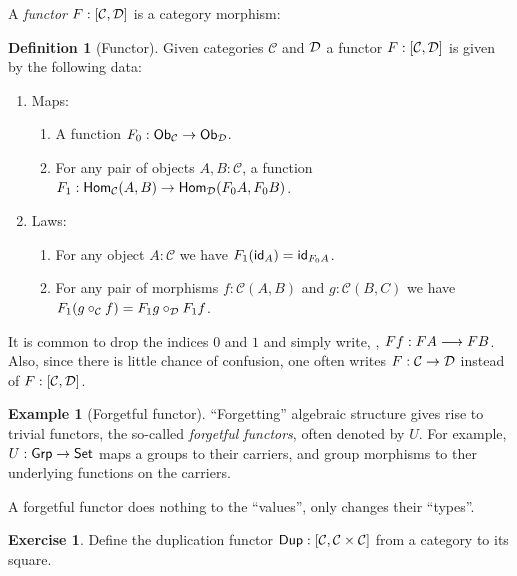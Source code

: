 \documentclass[a4paper,fleqn]{scrartcl}
\theoremstyle{definition}
\newtheorem{definition}{Definition}
\newtheorem{example}{Example}
\newtheorem{exercise}{Exercise}
\newcommand{\C}{\mathcal{C}}
\begin{document}
A \emph{functor} $F : [\C,\D]$ is a category morphism:
\begin{definition}[Functor]
  \label{def:functor}
  Given categories $\C$ and $\D$ a functor $F : [\C,\D]$
  is given by the following data:
  \begin{enumerate}
  \item Maps:
    \begin{enumerate}
    \item A function $F_0 : \Ob[\C] \to \Ob[\D]$.
    \item For any pair of objects $A,B : \C$, a function $F_1 :
      \Hom[\C](A,B) \to \Hom[\D](F_0A,F_0B)$.
    \end{enumerate}
  \item Laws:
    \begin{enumerate}
    \item For any object $A : \C$ we have $F_1(\id[A]) = \id[F_0A]$.
    \item For any pair of morphisms $f : \C(A,B)$ and $g : \C(B,C)$ we
      have $F_1(g \comp_\C f) = F_1g \comp_\D F_1f$.
    \end{enumerate}
  \end{enumerate}
\end{definition}
It is common to drop the indices $0$ and $1$ and simply write, \eg,
$Ff : FA \too FB$.
Also, since there is little chance of confusion, one often writes $F :
\C \to \D$ instead of $F : [\C,\D]$.
\begin{example}[Forgetful functor]
  ``Forgetting'' algebraic structure gives rise to trivial functors,
  the so-called \emph{forgetful functors}, often denoted by $U$.  For
  example, $U : \Grp \to \Set$ maps a groups to their carriers, and
  group morphisms to ther underlying functions on the carriers.

  A forgetful functor does nothing to the ``values'', only changes
  their ``types''.
\end{example}
\begin{exercise}
  Define the duplication functor $\Dup : [\C,\C \times \C]$
  from a category to its square.
\end{exercise}
\end{document}
